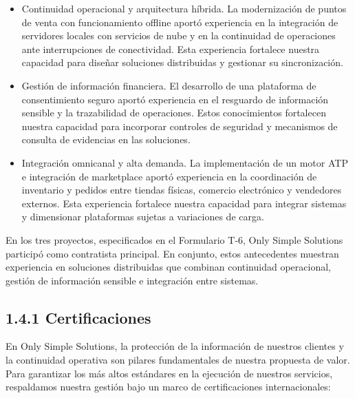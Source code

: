 \documentclass[11pt]{article}
\providecommand{\tightlist}{%
  \setlength{\itemsep}{0pt}\setlength{\parskip}{0pt}}
\begin{document}
\begin{itemize}
\tightlist
\item
  Continuidad operacional y arquitectura híbrida. La modernización de puntos de venta con funcionamiento offline aportó experiencia en la integración de servidores locales con servicios de nube y en la continuidad de operaciones ante interrupciones de conectividad. Esta experiencia fortalece nuestra capacidad para diseñar soluciones distribuidas y gestionar su sincronización.
\item
  Gestión de información financiera. El desarrollo de una plataforma de consentimiento seguro aportó experiencia en el resguardo de información sensible y la trazabilidad de operaciones. Estos conocimientos fortalecen nuestra capacidad para incorporar controles de seguridad y mecanismos de consulta de evidencias en las soluciones.
\item
  Integración omnicanal y alta demanda. La implementación de un motor ATP e integración de marketplace aportó experiencia en la coordinación de inventario y pedidos entre tiendas físicas, comercio electrónico y vendedores externos. Esta experiencia fortalece nuestra capacidad para integrar sistemas y dimensionar plataformas sujetas a variaciones de carga.
\end{itemize}

En los tres proyectos, especificados en el Formulario T-6, Only Simple Solutions participó como contratista principal. En conjunto, estos antecedentes muestran experiencia en soluciones distribuidas que combinan continuidad operacional, gestión de información sensible e integración entre sistemas.

\subsection{1.4.1 Certificaciones}\label{certificaciones}

En Only Simple Solutions, la protección de la información de nuestros clientes y la continuidad operativa son pilares fundamentales de nuestra propuesta de valor. Para garantizar los más altos estándares en la ejecución de nuestros servicios, respaldamos nuestra gestión bajo un marco de certificaciones internacionales:
\end{document}
